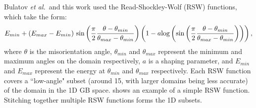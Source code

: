 \documentclass[twoside,senior]{BYUPhys}
\begin{document}
Bulatov \emph{et al.}\ and this work used the Read-Shockley-Wolf (RSW) functions,\cite{wolf1989} which take the form:
\begin{equation}
E_{min} + (E_{max} - E_{min})\ \textnormal{sin}\left(\frac{\pi}{2}\frac{\theta-\theta_{min}}{\theta_{max} - \theta_{min}}\right)\left(1-a\textnormal{log}\left(\textnormal{sin}\left(\frac{\pi}{2}\frac{\theta-\theta_{min}}{\theta_{max} - \theta_{min}}\right)\right)\right),
\end{equation}
where $\theta$ is the misorientation angle, $\theta_{min}$ and $\theta_{max}$ represent the minimum and maximum angles on the domain respectively, $a$ is a shaping parameter, and $E_{min}$ and $E_{max}$ represent the energy at $\theta_{min}$ and $\theta_{max}$ respectively.  Each RSW function covers a ``low-angle" subset (around 15\textdegree{}, with larger domains being less accurate)\cite{rohrer2011,wolf1989} of the domain in the 1D GB space.   shows an example of a simple RSW function.  Stitching together multiple RSW functions forms the 1D subsets.
\end{document}
